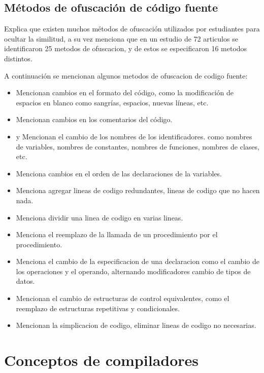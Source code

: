 \subsection{Métodos de ofuscación de código fuente}
\cite{Novak2019} Explica que existen muchos métodos de ofuscación utilizados por estudiantes para ocultar la similitud, a su vez menciona que en un estudio de 72 articulos se identificaron 25 metodos de ofuscacion, y de estos se especificaron 16 metodos distintos.

\noindent A continuación se mencionan algunos metodos de ofuscacion de codigo fuente:
\begin{itemize}
    \item \cite{article3} Mencionan cambios en el formato del código, como la modificación de espacios en blanco como sangrías, espacios, nuevas líneas, etc.
    \item \cite{article3} Mencionan cambios en los comentarios del código.
    \item \cite{Zoran2012} y \cite{donaldson1981plagiarism} Mencionan el cambio de los nombres de los identificadores. como nombres de variables, nombres de constantes, nombres de funciones, nombres de clases, etc.
    \item \cite{donaldson1981plagiarism} Menciona cambios en el orden de las declaraciones de la variables.
    \item \cite{Grier1981} Menciona agregar lineas de codigo redundantes, lineas de codigo que no hacen nada.
    \item \cite{donaldson1981plagiarism} Menciona dividir una linea de codigo en varias lineas.
    \item \cite{WHALE1990131} Menciona el reemplazo de la llamada de un procedimiento por el procedimiento.
    \item \cite{WHALE1990131} Menciona el cambio de la especificacion de una declaracion como el cambio de los operaciones y el operando, alternando modificadores cambio de tipos de datos.
    \item \cite{article3} Mencionan el cambio de estructuras de control equivalentes, como el reemplazo de estructuras repetitivas y condicionales.
    \item \cite{Zoran2012} Mencionan la simplicacion de codigo, eliminar lineas de codigo no necesarias.
\end{itemize}

\section{Conceptos de compiladores}

